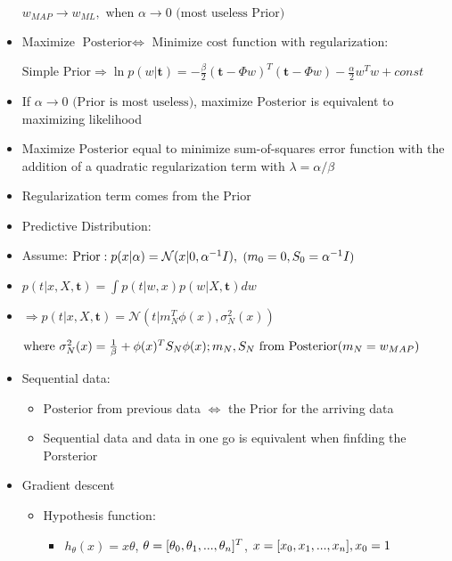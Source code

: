\begin{itemize}
$ w_{MAP} \rightarrow w_{ML}, \text{ when }\alpha \rightarrow 0 \text{ (most useless Prior)}$ 

\item Maximize $\text{Posterior} \Leftrightarrow$ Minimize $\text{cost function with regularization}$: 

	$ \text{Simple Prior} \Rightarrow \displaystyle \ln p(w|\boldsymbol t) = -\frac \beta 2 (\boldsymbol t-\Phi w)^T (\boldsymbol t-\Phi w)-\frac \alpha 2 w^Tw+const$ 

\item If $\alpha \to 0 \text { (Prior is most useless)}$, maximize $\text{Posterior}$ is equivalent to maximizing likelihood 
\item Maximize $\text{Posterior}$ equal to minimize sum-of-squares error function with the addition of a quadratic regularization term with $\lambda = \alpha/\beta$ 
\item Regularization term comes from the $\text{Prior}$ 

\item Predictive Distribution:

\item Assume: $\text{Prior}: p(x|\alpha) = \mathcal N(x|0,\alpha^{-1}I),\space \small\text{ (}m_0=0,S_0=\alpha^{-1}I \text{)}$ 

\item $\displaystyle p(t|x,X,\boldsymbol t) = \int p(t|w,x)p(w|X,\boldsymbol t)dw$ 

\item $\Rightarrow p(t|x,X,\boldsymbol t) = \mathcal N(t|m_N^T\phi(x),\sigma^2_N(x))$ 

	$\text{where } \sigma_N^2(x)=\frac 1 \beta + \phi(x)^TS_N\phi(x);\space m_N, S_N \text{ from Posterior} \small (m_N=w_{MAP})$ 

\item Sequential data:

	\begin{itemize}
	\item $\text{Posterior}$ from previous data $\Leftrightarrow$ the $\text{Prior}$ for the arriving data
	\item Sequential data and data in one go is equivalent when finfding the Porsterior
	\end{itemize}

\item Gradient descent

	\begin{itemize}
	\item Hypothesis function: 
		\begin{itemize}
		\item $h_\theta(x)=x\theta$, $\small\theta = [\theta_0, \theta_1, ..., \theta_n]^T$, $\small x=[x_0, x_1,..., x_n], x_0=1$
		\end{itemize}
	

\end{itemize}
\end{itemize}

